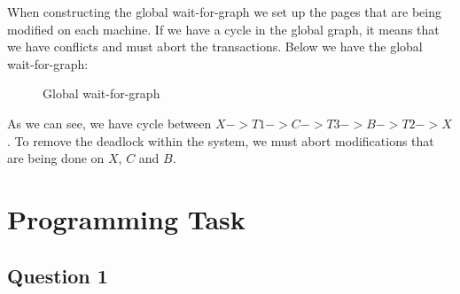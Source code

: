 \documentclass{article}      %
\begin{document}
When constructing the global wait-for-graph we set up the pages that are being modified on each machine. If we have a cycle in the global graph, it means that we have conflicts and must abort the transactions. Below we have the global wait-for-graph: \\

\begin{figure}[ht]
\centering

{%
\setlength{\fboxsep}{5pt}%
%
}%
\caption{Global wait-for-graph\label{overflow}}
\end{figure}

As we can see, we have cycle between  $X -> T1 -> C -> T3 -> B -> T2 -> X$. To remove the deadlock within the system, we must abort modifications that are being done on $X$, $C$ and $B$.\\

\section* {Programming Task}

\subsection* {Question 1}
\end{document}
